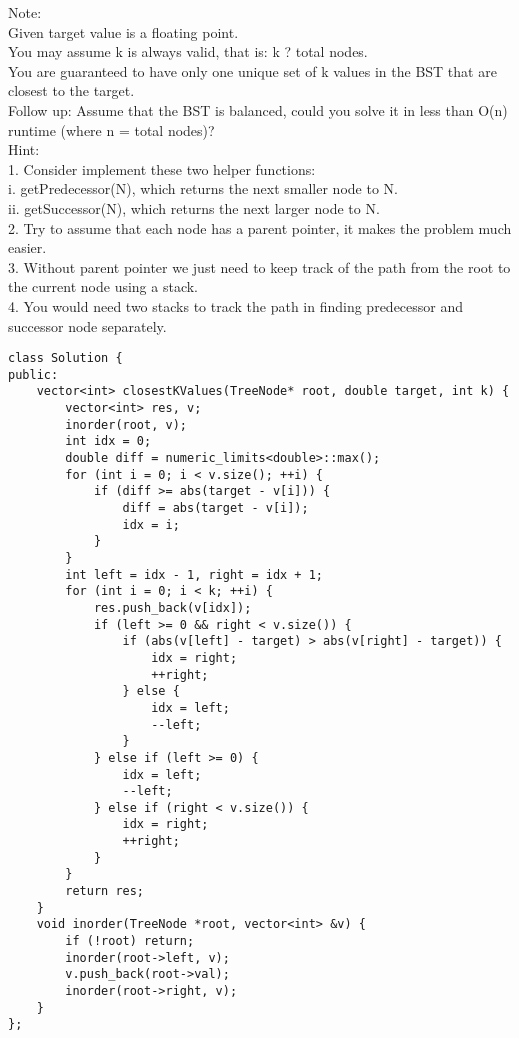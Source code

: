 Note:\\
    Given target value is a floating point.\\
    You may assume k is always valid, that is: k ? total nodes.\\
    You are guaranteed to have only one unique set of k values in the BST that are closest to the target.\\

Follow up:
Assume that the BST is balanced, could you solve it in less than O(n) runtime (where n = total nodes)?\\

Hint:\\
1. Consider implement these two helper functions:\\
i. getPredecessor(N), which returns the next smaller node to N.\\
ii. getSuccessor(N), which returns the next larger node to N.\\
2. Try to assume that each node has a parent pointer, it makes the problem much easier.\\
3. Without parent pointer we just need to keep track of the path from the root to the current node using a stack.\\
4. You would need two stacks to track the path in finding predecessor and successor node separately.\\

\begin{lstlisting}
class Solution {
public:
    vector<int> closestKValues(TreeNode* root, double target, int k) {
        vector<int> res, v;
        inorder(root, v);
        int idx = 0;
        double diff = numeric_limits<double>::max();
        for (int i = 0; i < v.size(); ++i) {
            if (diff >= abs(target - v[i])) {
                diff = abs(target - v[i]);
                idx = i;
            }
        }
        int left = idx - 1, right = idx + 1;
        for (int i = 0; i < k; ++i) {
            res.push_back(v[idx]);
            if (left >= 0 && right < v.size()) {
                if (abs(v[left] - target) > abs(v[right] - target)) {
                    idx = right;
                    ++right;
                } else {
                    idx = left;
                    --left;
                }
            } else if (left >= 0) {
                idx = left;
                --left;
            } else if (right < v.size()) {
                idx = right;
                ++right;
            }
        }
        return res;
    }
    void inorder(TreeNode *root, vector<int> &v) {
        if (!root) return;
        inorder(root->left, v);
        v.push_back(root->val);
        inorder(root->right, v);
    }
};
\end{lstlisting}




